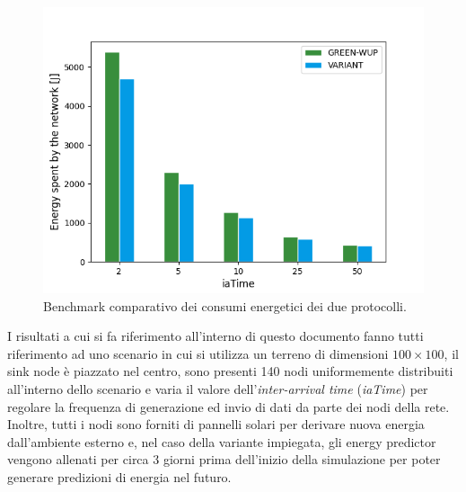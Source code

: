 \documentclass{report}
\begin{document}
\begin{figure}
    \begin{center}
        \includegraphics[scale=0.5]{energy_plot.png}
        \caption{Benchmark comparativo dei consumi energetici dei due protocolli.}
    \end{center}
\end{figure}

I risultati a cui si fa riferimento all'interno di questo documento fanno tutti riferimento ad uno scenario in cui si utilizza un terreno di dimensioni
$100 \times 100$, il sink node è piazzato nel centro, sono presenti 140 nodi uniformemente distribuiti all'interno dello scenario e varia il valore
dell'\emph{inter-arrival time} (\emph{iaTime}) per regolare la frequenza di generazione ed invio di dati da parte dei nodi della rete. Inoltre, tutti
i nodi sono forniti di pannelli solari per derivare nuova energia dall'ambiente esterno e, nel caso della variante impiegata, gli energy predictor
vengono allenati per circa 3 giorni prima dell'inizio della simulazione per poter generare predizioni di energia nel futuro.\\
\end{document}
